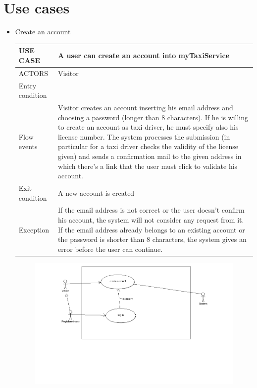 \section {Use cases}
\begin{itemize}
\item Create an account
	\begin{center}
    	\begin{tabular}{ | l | p{11cm} |}
    	\hline
   	USE CASE & A user can create an account into myTaxiService \\ \hline
    	ACTORS & Visitor \\ \hline
     	Entry condition &  \\ \hline
     	Flow events & Visitor creates an account inserting his email address and choosing a password (longer than 8 characters). If he is willing to create an account as taxi driver, he must specify also his license number. The system processes the submission (in particular for a taxi driver checks the validity of the license given) and sends a confirmation mail to the given address in which there’s a link that the user must 			click to validate his account. \\ \hline
     	Exit condition & A new account is created \\ \hline
     	Exception &  If the email address is not correct or the user doesn’t confirm his account, the system will not consider any 			request from it. If the email address already belongs to an existing account or the password is shorter than 8 characters, the 			system gives an error before the user can continue.\\ \hline
    \end{tabular}
	\end{center}
	\begin{center}
	\begin{figure} [h]
  	  \includegraphics[scale=0.5]{register.png}

\end{figure}
\end{center}
\end{itemize}

